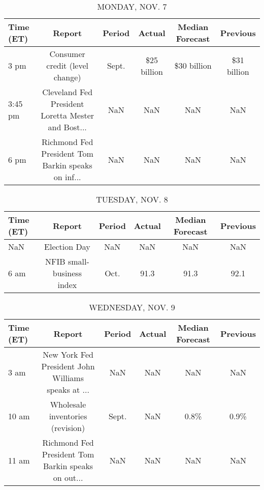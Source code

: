 \documentclass{article}%
\begin{document}
%
\normalsize%


\begin{table}[htbp]%
\caption{MONDAY, NOV. 7}%
\centering%
\begin{adjustbox}{width=1\textwidth}%
\begin{tabular}{lccccc}
\toprule
Time (ET) &                                             Report & Period &      Actual & Median Forecast &    Previous \\
\midrule
     3 pm &                     Consumer credit (level change) &  Sept. & \$25 billion &     \$30 billion & \$31 billion \\
  3:45 pm & Cleveland Fed President Loretta Mester and Bost... &    NaN &         NaN &             NaN &         NaN \\
     6 pm & Richmond Fed President Tom Barkin speaks on inf... &    NaN &         NaN &             NaN &         NaN \\
\bottomrule
\end{tabular}
%
\end{adjustbox}%
\end{table}

%


\begin{table}[htbp]%
\caption{TUESDAY, NOV. 8}%
\centering%
\begin{adjustbox}{width=1\textwidth}%
\begin{tabular}{lccccc}
\toprule
Time (ET) &                    Report & Period & Actual & Median Forecast & Previous \\
\midrule
      NaN &              Election Day &    NaN &    NaN &             NaN &      NaN \\
     6 am & NFIB small-business index &   Oct. &   91.3 &            91.3 &     92.1 \\
\bottomrule
\end{tabular}
%
\end{adjustbox}%
\end{table}

%


\begin{table}[htbp]%
\caption{WEDNESDAY, NOV. 9}%
\centering%
\begin{adjustbox}{width=1\textwidth}%
\begin{tabular}{lccccc}
\toprule
Time (ET) &                                             Report & Period & Actual & Median Forecast & Previous \\
\midrule
     3 am & New York Fed President John Williams speaks at ... &    NaN &    NaN &             NaN &      NaN \\
    10 am &                   Wholesale inventories (revision) &  Sept. &    NaN &            0.8\% &     0.9\% \\
    11 am & Richmond Fed President Tom Barkin speaks on out... &    NaN &    NaN &             NaN &      NaN \\
\bottomrule
\end{tabular}
%
\end{adjustbox}%
\end{table}
\end{document}
